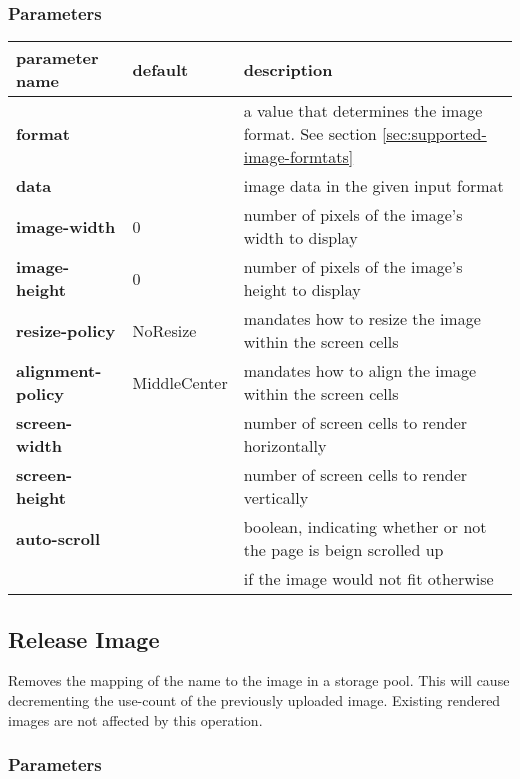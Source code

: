 \documentclass[a4paper]{article}
\begin{document}
\subsubsection*{Parameters}

\begin{tabular}{|l|l|l|}
    \hline
    \textbf{parameter name} & \textbf{default} & \textbf{description} \\
    \hline
    \textbf{format} & & a value that determines the image format. See section \ref{sec:supported-image-formtats} \\
    \textbf{data} & & image data in the given input format \\
    \textbf{image-width} & 0 & number of pixels of the image's width to display \\
    \textbf{image-height} & 0 & number of pixels of the image's height to display \\
    \textbf{resize-policy} & NoResize & mandates how to resize the image within the screen cells \\
    \textbf{alignment-policy} & MiddleCenter & mandates how to align the image within the screen cells \\
    \textbf{screen-width} & & number of screen cells to render horizontally \\
    \textbf{screen-height} & & number of screen cells to render vertically \\
    \textbf{auto-scroll} & & boolean, indicating whether or not the page is beign scrolled up \\
            & & if the image would not fit otherwise \\
    \hline
\end{tabular}


\subsection{Release Image} %

Removes the mapping of the name to the image in a storage pool.
This will cause decrementing the use-count of the previously uploaded image.
Existing rendered images are not affected by this operation.

\subsubsection*{Parameters}
\end{document}
